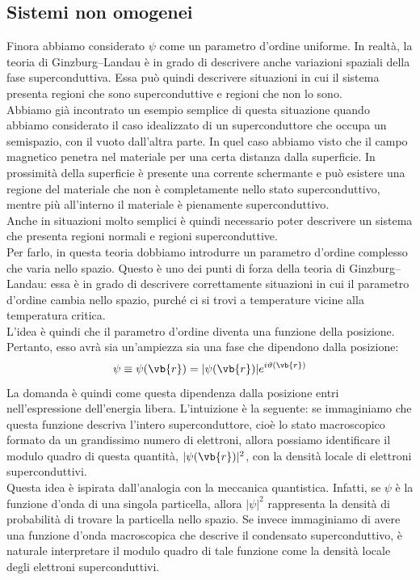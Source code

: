 \subsection{Sistemi non omogenei}
Finora abbiamo considerato $\psi$ come un parametro d'ordine uniforme. In realtà, la teoria di Ginzburg--Landau è in grado di descrivere anche variazioni spaziali della fase superconduttiva. Essa può quindi descrivere situazioni in cui il sistema presenta regioni che sono superconduttive e regioni che non lo sono.\\
Abbiamo già incontrato un esempio semplice di questa situazione quando abbiamo considerato il caso idealizzato di un superconduttore che occupa un semispazio, con il vuoto dall'altra parte. In quel caso abbiamo visto che il campo magnetico penetra nel materiale per una certa distanza dalla superficie. In prossimità della superficie è presente una corrente schermante e può esistere una regione del materiale che non è completamente nello stato superconduttivo, mentre più all'interno il materiale è pienamente superconduttivo.\\
Anche in situazioni molto semplici è quindi necessario poter descrivere un sistema che presenta regioni normali e regioni superconduttive.\\
Per farlo, in questa teoria dobbiamo introdurre un parametro d'ordine complesso che varia nello spazio. Questo è uno dei punti di forza della teoria di Ginzburg--Landau: essa è in grado di descrivere correttamente situazioni in cui il parametro d'ordine cambia nello spazio, purché ci si trovi a temperature vicine alla temperatura critica.\\
L'idea è quindi che il parametro d'ordine diventa una funzione della posizione. Pertanto, esso avrà sia un'ampiezza sia una fase che dipendono dalla posizione:
\begin{equation*}
   \psi
   \equiv \psi(\vb{r})
   = |\psi(\vb{r})| e^{i\vartheta(\vb{r})}
\end{equation*}
La domanda è quindi come questa dipendenza dalla posizione entri nell'espressione dell'energia libera. L'intuizione è la seguente: se immaginiamo che questa funzione descriva l'intero superconduttore, cioè lo stato macroscopico formato da un grandissimo numero di elettroni, allora possiamo identificare il modulo quadro di questa quantità, $|\psi(\vb{r})|^2$, con la densità locale di elettroni superconduttivi.\\
Questa idea è ispirata dall'analogia con la meccanica quantistica. Infatti, se $\psi$ è la funzione d'onda di una singola particella, allora $|\psi|^2$ rappresenta la densità di probabilità di trovare la particella nello spazio. Se invece immaginiamo di avere una funzione d'onda macroscopica che descrive il condensato superconduttivo, è naturale interpretare il modulo quadro di tale funzione come la densità locale degli elettroni superconduttivi.\\

